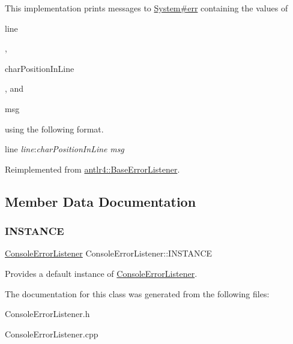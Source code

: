 This implementation prints messages to \hyperlink{}{System\#err} containing the values of
\begin{DoxyCode}
line 
\end{DoxyCode}
 ,
\begin{DoxyCode}
charPositionInLine 
\end{DoxyCode}
 , and
\begin{DoxyCode}
msg 
\end{DoxyCode}
 using the following format.


\begin{DoxyPre}
line {\itshape line}:{\itshape charPositionInLine} {\itshape msg}
\end{DoxyPre}
 

Reimplemented from \hyperlink{classantlr4_1_1BaseErrorListener}{antlr4\+::\+Base\+Error\+Listener}.



\subsection{Member Data Documentation}
\mbox{\label{classantlr4_1_1ConsoleErrorListener_a61b93f6c4f075888001972f35698d5ff}} 
\subsubsection{\texorpdfstring{I\+N\+S\+T\+A\+N\+CE}{INSTANCE}}
{\footnotesize\ttfamily \hyperlink{classantlr4_1_1ConsoleErrorListener}{Console\+Error\+Listener} Console\+Error\+Listener\+::\+I\+N\+S\+T\+A\+N\+CE\hspace{0.3cm}{\ttfamily [static]}}

Provides a default instance of \hyperlink{classantlr4_1_1ConsoleErrorListener}{Console\+Error\+Listener}. 

The documentation for this class was generated from the following files\+:\begin{DoxyCompactItemize}
\item 
Console\+Error\+Listener.\+h\item 
Console\+Error\+Listener.\+cpp\end{DoxyCompactItemize}
